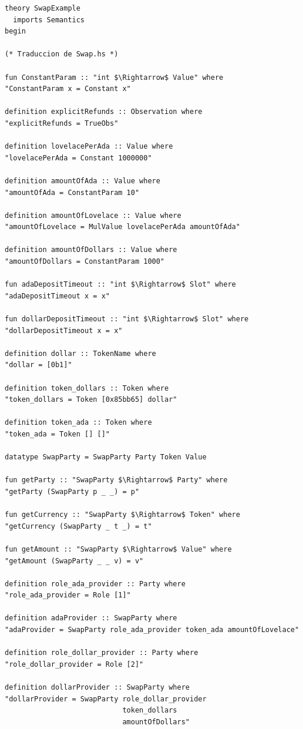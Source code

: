 \documentclass[12pt]{book}
\begin{document}
\begin{lstlisting}[style=Isabelle, caption=Definición del contrato \textit{Swap}]
theory SwapExample
  imports Semantics
begin

(* Traduccion de Swap.hs *)

fun ConstantParam :: "int $\Rightarrow$ Value" where
"ConstantParam x = Constant x"

definition explicitRefunds :: Observation where
"explicitRefunds = TrueObs"

definition lovelacePerAda :: Value where
"lovelacePerAda = Constant 1000000"

definition amountOfAda :: Value where 
"amountOfAda = ConstantParam 10" 

definition amountOfLovelace :: Value where
"amountOfLovelace = MulValue lovelacePerAda amountOfAda"

definition amountOfDollars :: Value where
"amountOfDollars = ConstantParam 1000"

fun adaDepositTimeout :: "int $\Rightarrow$ Slot" where
"adaDepositTimeout x = x"

fun dollarDepositTimeout :: "int $\Rightarrow$ Slot" where
"dollarDepositTimeout x = x"

definition dollar :: TokenName where
"dollar = [0b1]" 

definition token_dollars :: Token where
"token_dollars = Token [0x85bb65] dollar"

definition token_ada :: Token where
"token_ada = Token [] []"

datatype SwapParty = SwapParty Party Token Value

fun getParty :: "SwapParty $\Rightarrow$ Party" where
"getParty (SwapParty p _ _) = p"

fun getCurrency :: "SwapParty $\Rightarrow$ Token" where
"getCurrency (SwapParty _ t _) = t"

fun getAmount :: "SwapParty $\Rightarrow$ Value" where
"getAmount (SwapParty _ _ v) = v"

definition role_ada_provider :: Party where
"role_ada_provider = Role [1]"

definition adaProvider :: SwapParty where
"adaProvider = SwapParty role_ada_provider token_ada amountOfLovelace"

definition role_dollar_provider :: Party where
"role_dollar_provider = Role [2]"

definition dollarProvider :: SwapParty where
"dollarProvider = SwapParty role_dollar_provider
                            token_dollars 
                            amountOfDollars"


\end{lstlisting}
\end{document}
